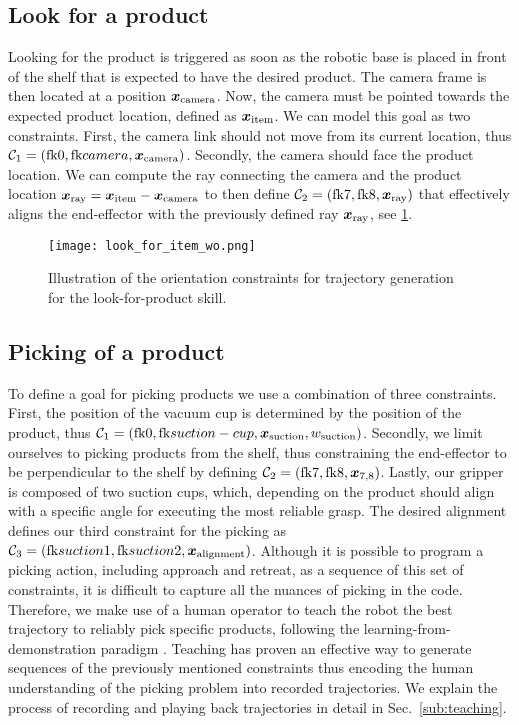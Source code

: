 \subsection{Look for a product}
\label{sub:look_for_product}
Looking for the product is triggered as soon as the robotic
base is placed in front of the shelf that is expected to
have the desired product. The camera frame is then located
at a position $\bm{x}_{\textrm{camera}}$. Now, the camera
must be pointed towards the expected product location, defined as
$\bm{x}_{\textrm{item}}$. We can model this goal as two
constraints. First, the camera link should not move from its
current location, thus $\mathcal{C}_1 =
(\textrm{fk}{0},\textrm{fk}{camera},\bm{x}_{\textrm{camera}})$. Secondly, the
camera should face the product location. We can compute the
ray connecting the camera and the product location
$\bm{x}_{\textrm{ray}} = \bm{x}_{\textrm{item}} - \bm{x}_{\textrm{camera}}$ to then
define $\mathcal{C}_2 = (\textrm{fk}{7}, \textrm{fk}{8},  \bm{x}_{\textrm{ray}})$
that effectively aligns the end-effector with the previously
defined ray $\bm{x}_{\textrm{ray}}$, see
\cref{fig:look_for_product}.

\begin{figure}
  \begin{center}
    \texttt{[image: look\_for\_item\_wo.png]}
  \end{center}
  \caption{Illustration of the orientation constraints for trajectory
  generation for the look-for-product skill.}
  \label{fig:look_for_product}
\end{figure}


\subsection{Picking of a product}
\label{sub:picking}
To define a goal for picking products we use a combination of three constraints.
First, the position of the vacuum cup is determined by the
position of the product, thus $\mathcal{C}_1 =
(\textrm{fk}{0},\textrm{fk}{suction-cup}, \bm{x}_{\textrm{suction}}, w_{\textrm{suction}})$. Secondly, we
limit  ourselves to picking products from the shelf, thus
constraining the end-effector to be perpendicular to the
shelf by defining $\mathcal{C}_2 = (\textrm{fk}{7},\textrm{fk}{8}, \bm{x}_{7,8})$. Lastly, our gripper is composed of two
suction cups, which, depending on the product should align with a specific angle for executing the most reliable grasp. The desired alignment defines
our third constraint for the picking as $\mathcal{C}_3 =
(\textrm{fk}{suction1}, \textrm{fk}{suction2}, \bm{x}_{\textrm{alignment}})$. Although it is possible to
program a picking action, including approach and retreat, as a sequence of this set of
constraints, it is difficult to capture all the nuances of
picking in the code. Therefore, we make use of a human operator to teach the robot the best trajectory to reliably pick specific products, following the 
learning-from-demonstration paradigm
\cite{celemin2022interactive}. Teaching has proven an effective way to generate sequences of the previously mentioned
constraints thus encoding the human understanding of the picking problem into recorded trajectories. We explain the process of
recording and playing back trajectories in detail in Sec.~\ref{sub:teaching}. 
%

